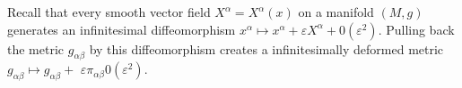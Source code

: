 \documentclass[preview]{standalone}
\begin{document}
\begin{center}
\begin{justify}Recall that every smooth vector field $X^{\alpha}=X^{\alpha}(x)$ on a manifold $(M, g)$ generates an infinitesimal diffeomorphism $x^{\alpha} \mapsto x^{\alpha}+\varepsilon X^{\alpha}+0\left(\varepsilon^{2}\right)$. Pulling back the metric $g_{\alpha \beta}$ by this diffeomorphism creates a infinitesimally deformed metric $g_{\alpha \beta} \mapsto g_{\alpha \beta}+$ $\varepsilon \pi_{\alpha \beta}0\left(\varepsilon^{2}\right)$.\end{justify}
\end{center}
\end{document}
